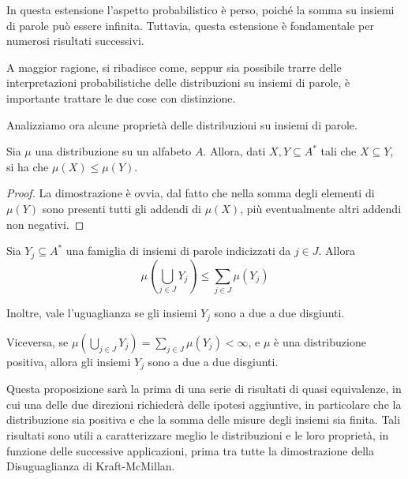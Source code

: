 \begin{note}{}
  In questa estensione l'aspetto probabilistico è perso, poiché la somma su insiemi di parole può essere infinita.
  Tuttavia, questa estensione è fondamentale per numerosi risultati successivi.

  A maggior ragione, si ribadisce come, seppur sia possibile trarre delle interpretazioni probabilistiche delle distribuzioni su insiemi di parole, è importante trattare le due cose con distinzione.
\end{note}

Analizziamo ora alcune proprietà delle distribuzioni su insiemi di parole.
\begin{proposition}[label=prop:distribution_monotonicity]{}
  Sia \(\mu\) una distribuzione su un alfabeto \(A\).
  Allora, dati \(X,Y \subseteq A^*\) tali che \(X \subseteq Y\), si ha che \(\mu(X) \leq \mu(Y)\).
\end{proposition}
\begin{proof}
  La dimostrazione è ovvia, dal fatto che nella somma degli elementi di \(\mu(Y)\) sono presenti tutti gli addendi di \(\mu(X)\), più eventualmente altri addendi non negativi.
\end{proof}

\begin{proposition}[label=prop:dist_union_leq_sum_dist]{}
  Sia \(Y_j \subseteq A^*\) una famiglia di insiemi di parole indicizzati da \(j \in J\). 
  Allora
  \[\mu(\bigcup_{j \in J}Y_j) \leq \sum_{j\in J} \mu(Y_j)\]

  Inoltre, vale l'uguaglianza se gli insiemi \(Y_j\) sono a due a due disgiunti.

  Viceversa, se \(\mu(\bigcup_{j \in J}Y_j) = \sum_{j\in J} \mu(Y_j) < \infty\), e \(\mu\) è una distribuzione positiva, allora gli insiemi \(Y_j\) sono a due a due disgiunti.
\end{proposition}

Questa proposizione sarà la prima di una serie di risultati di quasi equivalenze, in cui una delle due direzioni richiederà delle ipotesi aggiuntive, in particolare che la distribuzione sia positiva e che la somma delle misure degli insiemi sia finita.
Tali risultati sono utili a caratterizzare meglio le distribuzioni e le loro proprietà, in funzione delle successive applicazioni, prima tra tutte la dimostrazione della Disuguaglianza di Kraft-McMillan.

